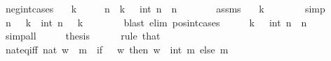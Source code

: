 \begin{isabellebody}
%
\endisatagproof
{\isafoldproof}%
%
\isadelimproof
\isanewline
%
\endisadelimproof
\isanewline
{}\isamarkupfalse%
\ neg{\isacharunderscore}{\kern0pt}int{\isacharunderscore}{\kern0pt}cases{\isacharcolon}{\kern0pt}\isanewline
\ \ \ {\isachardoublequoteopen}k\ {\isacharless}{\kern0pt}\ {}{\isachardoublequoteclose}\isanewline
\ \ \ n\ \ {\isachardoublequoteopen}k\ {\isacharequal}{\kern0pt}\ {\isacharminus}{\kern0pt}\ int\ n{\isachardoublequoteclose}\ \ {\isachardoublequoteopen}n\ {\isachargreater}{\kern0pt}\ {}{\isachardoublequoteclose}\isanewline
%
\isadelimproof
%
\endisadelimproof
%
\isatagproof
{}\isamarkupfalse%
\ {\isacharminus}{\kern0pt}\isanewline
\ \ \isamarkupfalse%
\ assms\ \isamarkupfalse%
\ {\isachardoublequoteopen}{\isacharminus}{\kern0pt}\ k\ {\isachargreater}{\kern0pt}\ {}{\isachardoublequoteclose}\isanewline
\ \ \ \ \isamarkupfalse%
\ simp\isanewline
\ \ \isamarkupfalse%
\ \isamarkupfalse%
\ n\ \ {\isachardoublequoteopen}{\isacharminus}{\kern0pt}\ k\ {\isacharequal}{\kern0pt}\ int\ n{\isachardoublequoteclose}\ \ {\isachardoublequoteopen}{\isacharminus}{\kern0pt}\ k\ {\isachargreater}{\kern0pt}\ {}{\isachardoublequoteclose}\isanewline
\ \ \ \ \isamarkupfalse%
\ {\isacharparenleft}{\kern0pt}blast\ elim{\isacharcolon}{\kern0pt}\ pos{\isacharunderscore}{\kern0pt}int{\isacharunderscore}{\kern0pt}cases{\isacharparenright}{\kern0pt}\isanewline
\ \ \isamarkupfalse%
\ \isamarkupfalse%
\ {\isachardoublequoteopen}k\ {\isacharequal}{\kern0pt}\ {\isacharminus}{\kern0pt}\ int\ n{\isachardoublequoteclose}\ \ {\isachardoublequoteopen}n\ {\isachargreater}{\kern0pt}\ {}{\isachardoublequoteclose}\isanewline
\ \ \ \ \isamarkupfalse%
\ simp{\isacharunderscore}{\kern0pt}all\isanewline
\ \ \isamarkupfalse%
\ \isamarkupfalse%
\ thesis\isanewline
\ \ \ \ \isamarkupfalse%
\ {\isacharparenleft}{\kern0pt}rule\ that{\isacharparenright}{\kern0pt}\isanewline
{}\isamarkupfalse%
%
\endisatagproof
{\isafoldproof}%
%
\isadelimproof
\isanewline
%
\endisadelimproof
\isanewline
{}\isamarkupfalse%
\ nat{\isacharunderscore}{\kern0pt}eq{\isacharunderscore}{\kern0pt}iff{\isacharcolon}{\kern0pt}\ {\isachardoublequoteopen}nat\ w\ {\isacharequal}{\kern0pt}\ m\ {\isasymlongleftrightarrow}\ {\isacharparenleft}{\kern0pt}if\ {}\ {\isasymle}\ w\ then\ w\ {\isacharequal}{\kern0pt}\ int\ m\ else\ m\ {\isacharequal}{\kern0pt}\ {}{\isacharparenright}{\kern0pt}{\isachardoublequoteclose}\isanewline

\end{isabellebody}
